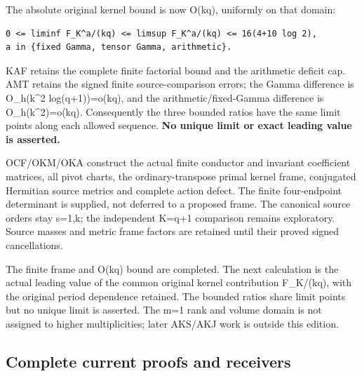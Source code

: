 \documentclass[
]{article}
\begin{document}
The absolute original kernel bound is now O(kq), uniformly on that
domain:

\begin{verbatim}
0 <= liminf F_K^a/(kq) <= limsup F_K^a/(kq) <= 16(4+10 log 2),
a in {fixed Gamma, tensor Gamma, arithmetic}.
\end{verbatim}

KAF retains the complete finite factorial bound and the arithmetic
deficit cap. AMT retains the signed finite source-comparison errors; the
Gamma difference is O\_h(k\^{}2 log(q+1))=o(kq), and the
arithmetic/fixed-Gamma difference is O\_h(k\^{}2)=o(kq). Consequently
the three bounded ratios have the same limit points along each allowed
sequence. \textbf{No unique limit or exact leading value is asserted.}

OCF/OKM/OKA construct the actual finite conductor and invariant
coefficient matrices, all pivot charts, the ordinary-transpose primal
kernel frame, conjugated Hermitian source metrics and complete action
defect. The finite four-endpoint determinant is supplied, not deferred
to a proposed frame. The canonical source orders stay s=1,k; the
independent K=q+1 comparison remains exploratory. Source masses and
metric frame factors are retained until their proved signed
cancellations.

The finite frame and O(kq) bound are completed. The next calculation is
the actual leading value of the common original kernel contribution
F\_K/(kq), with the original period dependence retained. The bounded
ratios share limit points but no unique limit is asserted. The m=1 rank
and volume domain is not assigned to higher multiplicities; later
AKS/AKJ work is outside this edition.

\subsection{Complete current proofs and
receivers}\label{complete-current-proofs-and-receivers}
\end{document}
